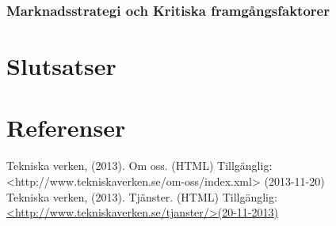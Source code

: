 \documentclass[10pt,a4paper]{article}
\begin{document}
\subsubsection{Marknadsstrategi och Kritiska framgångsfaktorer}


\section{Slutsatser}

\section{Referenser}
Tekniska verken, (2013). Om oss. (HTML) Tillgänglig: \newline
<http://www.tekniskaverken.se/om-oss/index.xml> (2013-11-20)\\
Tekniska verken, (2013). Tjänster. (HTML) Tillgänglig: \\
\hyperref{http://www.tekniskaverken.se/tjanster/}{}{}{<http://www.tekniskaverken.se/tjanster/>(20-11-2013)}
\end{document}
